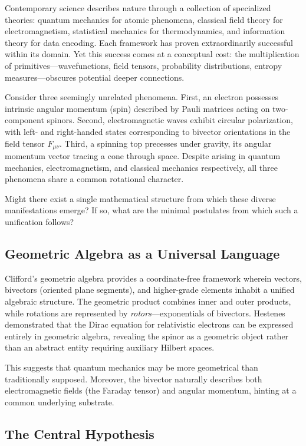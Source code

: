 \documentclass[11pt,a4paper]{article}
\theoremstyle{definition}
\theoremstyle{plain}
\theoremstyle{remark}
\begin{document}
Contemporary science describes nature through a collection of specialized theories: quantum mechanics for atomic phenomena, classical field theory for electromagnetism, statistical mechanics for thermodynamics, and information theory for data encoding. Each framework has proven extraordinarily successful within its domain. Yet this success comes at a conceptual cost: the multiplication of primitives---wavefunctions, field tensors, probability distributions, entropy measures---obscures potential deeper connections.

Consider three seemingly unrelated phenomena. First, an electron possesses intrinsic angular momentum (spin) described by Pauli matrices acting on two-component spinors. Second, electromagnetic waves exhibit circular polarization, with left- and right-handed states corresponding to bivector orientations in the field tensor $F_{\mu\nu}$. Third, a spinning top precesses under gravity, its angular momentum vector tracing a cone through space. Despite arising in quantum mechanics, electromagnetism, and classical mechanics respectively, all three phenomena share a common rotational character.

Might there exist a single mathematical structure from which these diverse manifestations emerge? If so, what are the minimal postulates from which such a unification follows?

\subsection{Geometric Algebra as a Universal Language}

Clifford's geometric algebra provides a coordinate-free framework wherein vectors, bivectors (oriented plane segments), and higher-grade elements inhabit a unified algebraic structure. The geometric product combines inner and outer products, while rotations are represented by \emph{rotors}---exponentials of bivectors. Hestenes demonstrated that the Dirac equation for relativistic electrons can be expressed entirely in geometric algebra, revealing the spinor as a geometric object rather than an abstract entity requiring auxiliary Hilbert spaces.

This suggests that quantum mechanics may be more geometrical than traditionally supposed. Moreover, the bivector naturally describes both electromagnetic fields (the Faraday tensor) and angular momentum, hinting at a common underlying substrate.

\subsection{The Central Hypothesis}
\end{document}
